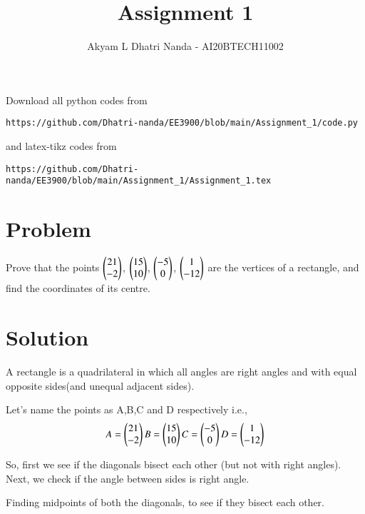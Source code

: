 \documentclass[journal,12pt,twocolumn]{IEEEtran}
\begin{document}
     \def\rightbox#1{\makebox[0in][r]{#1}}
     \def\centbox#1{\makebox[0in]{#1}}
     \def\topbox#1{\raisebox{-\baselineskip}[0in][0in]{#1}}
     \def\midbox#1{\raisebox{-0.5\baselineskip}[0in][0in]{#1}}
\vspace{3cm}
\title{Assignment 1}
\author{Akyam L Dhatri Nanda - AI20BTECH11002}
\maketitle
\newpage
\bigskip
\renewcommand{\thefigure}{\theenumi}
\renewcommand{\thetable}{\theenumi}
Download all python codes from 
\begin{lstlisting}
https://github.com/Dhatri-nanda/EE3900/blob/main/Assignment_1/code.py
\end{lstlisting}
%
and latex-tikz codes from 
%
\begin{lstlisting}
https://github.com/Dhatri-nanda/EE3900/blob/main/Assignment_1/Assignment_1.tex
\end{lstlisting}
\section{Problem}
Prove that the points $\begin{pmatrix}21\\-2\end{pmatrix}$, $\begin{pmatrix}15\\10\end{pmatrix}$, $\begin{pmatrix}-5\\0\end{pmatrix}$, $\begin{pmatrix}1\\-12\end{pmatrix}$ are the vertices of a rectangle, and find the coordinates of its centre.

\section{Solution}
A rectangle is a quadrilateral in which all angles are right angles and with equal opposite sides(and unequal adjacent sides). 

Let's name the points as A,B,C and D respectively i.e.,
\begin{align}
A = \begin{pmatrix}21\\-2\end{pmatrix}
B = \begin{pmatrix}15\\10\end{pmatrix}
C = \begin{pmatrix}-5\\0\end{pmatrix}
D = \begin{pmatrix}1\\-12\end{pmatrix}\label{eq 2.0.1}
\end{align}

So, first we see if the diagonals bisect each other (but not with right angles). Next, we check if the angle between sides is right angle.

Finding midpoints of both the diagonals, to see if they bisect each other.
\end{document}
